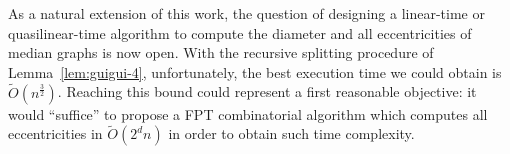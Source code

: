 \documentclass[a4paper,UKenglish,numberwithinsect,cleveref, autoref]{lipics-v2021}
\newcommand{\set}[1]{\left\{ #1 \right\}}
\begin{document}
%
%
%
%
%


As a natural extension of this work, the question of designing a linear-time or quasilinear-time algorithm to compute
the diameter and all eccentricities of median graphs is now open. With the recursive splitting procedure of Lemma~\ref{lem:guigui-4}, unfortunately, the best execution time we could obtain is $\tilde{O}(n^{\frac{3}{2}})$. Reaching this bound could represent a first reasonable objective: it would ``suffice'' to propose a FPT combinatorial algorithm which computes all eccentricities in $\tilde{O}(2^dn)$ in order to obtain such time complexity. 
\end{document}
